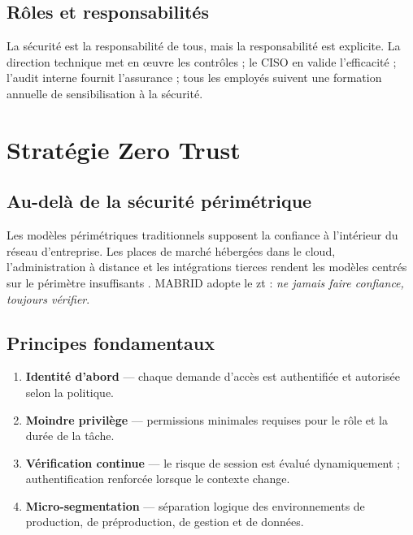 \subsection{Rôles et responsabilités}

La sécurité est la responsabilité de tous, mais la responsabilité est explicite. La direction technique met en œuvre les contrôles ; le CISO en valide l'efficacité ; l'audit interne fournit l'assurance ; tous les employés suivent une formation annuelle de sensibilisation à la sécurité.


\section{Stratégie Zero Trust}

\subsection{Au-delà de la sécurité périmétrique}

Les modèles périmétriques traditionnels supposent la confiance à l'intérieur du réseau d'entreprise. Les places de marché hébergées dans le cloud, l'administration à distance et les intégrations tierces rendent les modèles centrés sur le périmètre insuffisants \parencite{kindervag2010zero,rose2020zt}. MABRID adopte le \gls{zt} : \emph{ne jamais faire confiance, toujours vérifier}.

\subsection{Principes fondamentaux}

\begin{enumerate}
  \item \textbf{Identité d'abord} --- chaque demande d'accès est authentifiée et autorisée selon la politique.
  \item \textbf{Moindre privilège} --- permissions minimales requises pour le rôle et la durée de la tâche.
  \item \textbf{Vérification continue} --- le risque de session est évalué dynamiquement ; authentification renforcée lorsque le contexte change.
  \item \textbf{Micro-segmentation} --- séparation logique des environnements de production, de préproduction, de gestion et de données.
\end{enumerate}

